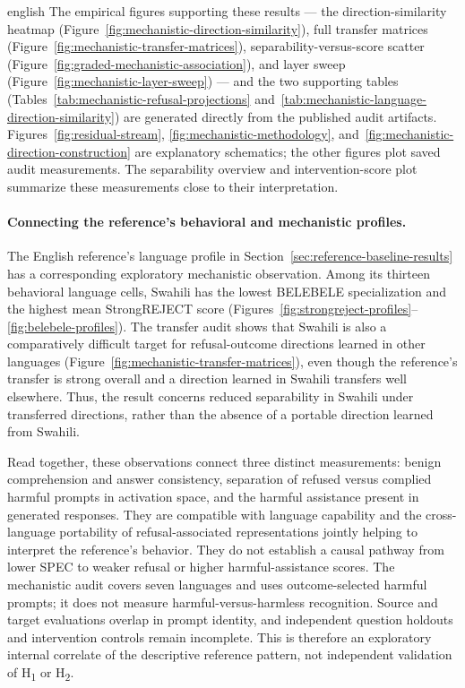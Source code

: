\begin{otherlanguage*}{english}
The empirical figures supporting these results --- the direction-similarity heatmap (Figure~\ref{fig:mechanistic-direction-similarity}), full transfer matrices (Figure~\ref{fig:mechanistic-transfer-matrices}), separability-versus-score scatter (Figure~\ref{fig:graded-mechanistic-association}), and layer sweep (Figure~\ref{fig:mechanistic-layer-sweep}) --- and the two supporting tables (Tables~\ref{tab:mechanistic-refusal-projections} and~\ref{tab:mechanistic-language-direction-similarity}) are generated directly from the published audit artifacts. Figures~\ref{fig:residual-stream}, \ref{fig:mechanistic-methodology}, and~\ref{fig:mechanistic-direction-construction} are explanatory schematics; the other figures plot saved audit measurements. The separability overview and intervention-score plot summarize these measurements close to their interpretation.

\MechTransferAnalysisText

\paragraph*{Connecting the reference's behavioral and mechanistic profiles.} The English reference's language profile in Section~\ref{sec:reference-baseline-results} has a corresponding exploratory mechanistic observation. Among its thirteen behavioral language cells, Swahili has the lowest BELEBELE specialization and the highest mean StrongREJECT score (Figures~\ref{fig:strongreject-profiles}--\ref{fig:belebele-profiles}). The transfer audit shows that Swahili is also a comparatively difficult target for refusal-outcome directions learned in other languages (Figure~\ref{fig:mechanistic-transfer-matrices}), even though the reference's transfer is strong overall and a direction learned in Swahili transfers well elsewhere. Thus, the result concerns reduced separability in Swahili under transferred directions, rather than the absence of a portable direction learned from Swahili.

Read together, these observations connect three distinct measurements: benign comprehension and answer consistency, separation of refused versus complied harmful prompts in activation space, and the harmful assistance present in generated responses. They are compatible with language capability and the cross-language portability of refusal-associated representations jointly helping to interpret the reference's behavior. They do not establish a causal pathway from lower SPEC to weaker refusal or higher harmful-assistance scores. The mechanistic audit covers seven languages and uses outcome-selected harmful prompts; it does not measure harmful-versus-harmless recognition. Source and target evaluations overlap in prompt identity, and independent question holdouts and intervention controls remain incomplete. This is therefore an exploratory internal correlate of the descriptive reference pattern, not independent validation of H\textsubscript{1} or H\textsubscript{2}.


\end{otherlanguage*}
